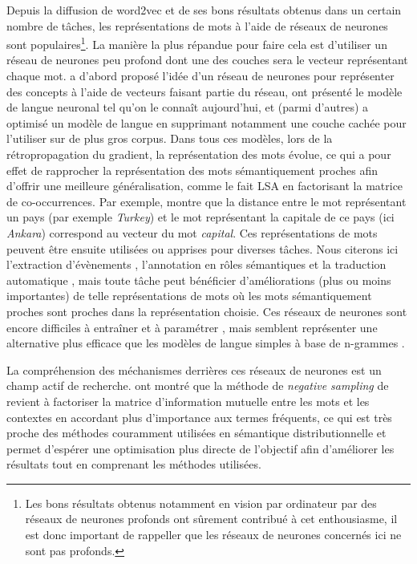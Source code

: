 Depuis la diffusion de word2vec \citep{mikolov2013distributed} et de ses bons
résultats obtenus dans un certain nombre de tâches, les représentations de mots
à l'aide de réseaux de neurones sont populaires\footnote{Les bons résultats
    obtenus notamment en vision par ordinateur par des réseaux de neurones
    profonds ont sûrement contribué à cet enthousiasme, il est donc important
    de rappeller que les réseaux de neurones concernés ici ne sont pas
profonds.}.  La manière la plus répandue pour faire cela est d'utiliser un
réseau de neurones peu profond dont une des couches sera le vecteur
représentant chaque mot.  \cite{hinton1986learning} a d'abord proposé l'idée
d'un réseau de neurones pour représenter des concepts à l'aide de vecteurs
faisant partie du réseau, \cite{bengio2001neural,bengio2003neural} ont présenté
le modèle de langue neuronal tel qu'on le connaît aujourd'hui, et
\cite{mikolov2013distributed} (parmi d'autres) a optimisé un modèle de langue
en supprimant notamment une couche cachée pour l'utiliser sur de plus gros
corpus. Dans tous ces modèles, lors de la rétropropagation du gradient, la
représentation des mots évolue, ce qui a pour effet de rapprocher la
représentation des mots sémantiquement proches afin d'offrir une meilleure
généralisation, comme le fait LSA en factorisant la matrice de co-occurrences.
Par exemple, \cite{mikolov2013distributed} montre que la distance entre le mot
représentant un pays (par exemple \emph{Turkey}) et le mot représentant la
capitale de ce pays (ici \emph{Ankara}) correspond au vecteur du mot
\emph{capital}.  Ces représentations de mots peuvent être ensuite utilisées ou
apprises pour diverses tâches. Nous citerons ici l'extraction d'évènements
\citep{boros2014etiquetage}, l'annotation en rôles sémantiques
\citep{lechelle2014utilisation} et la traduction automatique
\citep{devlin2014fast}, mais toute tâche peut bénéficier d'améliorations (plus
ou moins importantes) de telle représentations de mots où les mots
sémantiquement proches sont proches dans la représentation choisie.  Ces
réseaux de neurones sont encore difficiles à entraîner et à paramétrer
\citep{do2014modeles}, mais semblent représenter une alternative plus efficace
que les modèles de langue simples à base de n-grammes \citep{baroni2014dont}.

La compréhension des méchanismes derrières ces réseaux de neurones est un champ
actif de recherche. \cite{levy2014neural} ont montré que la méthode de
\emph{negative sampling} de \cite{mikolov2013distributed} revient à factoriser
la matrice d'information mutuelle entre les mots et les contextes en accordant
plus d'importance aux termes fréquents, ce qui est très proche des méthodes
couramment utilisées en sémantique distributionnelle et permet d'espérer une
optimisation plus directe de l'objectif afin d'améliorer les résultats tout en
comprenant les méthodes utilisées.

